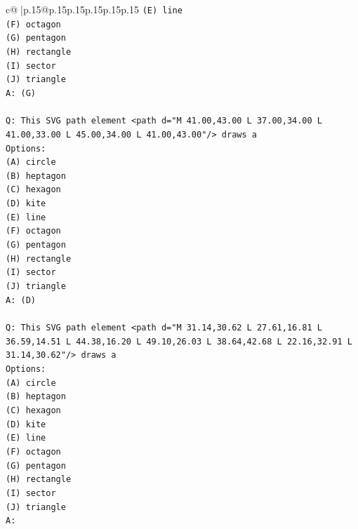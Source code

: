 \documentclass{article}
\begin{document}
{\begin{supertabular}{c@{$\;$}|p{.15\linewidth}@{}p{.15\linewidth}p{.15\linewidth}p{.15\linewidth}p{.15\linewidth}p{.15\linewidth}}
{{{\texttt{(E) line} \\
\texttt{(F) octagon} \\
\texttt{(G) pentagon} \\
\texttt{(H) rectangle} \\
\texttt{(I) sector} \\
\texttt{(J) triangle} \\
\texttt{A: (G)} \\
\\ 
\texttt{Q: This SVG path element <path d="M 41.00,43.00 L 37.00,34.00 L 41.00,33.00 L 45.00,34.00 L 41.00,43.00"/> draws a} \\
\texttt{Options:} \\
\texttt{(A) circle} \\
\texttt{(B) heptagon} \\
\texttt{(C) hexagon} \\
\texttt{(D) kite} \\
\texttt{(E) line} \\
\texttt{(F) octagon} \\
\texttt{(G) pentagon} \\
\texttt{(H) rectangle} \\
\texttt{(I) sector} \\
\texttt{(J) triangle} \\
\texttt{A: (D)} \\
\\ 
\texttt{Q: This SVG path element <path d="M 31.14,30.62 L 27.61,16.81 L 36.59,14.51 L 44.38,16.20 L 49.10,26.03 L 38.64,42.68 L 22.16,32.91 L 31.14,30.62"/> draws a} \\
\texttt{Options:} \\
\texttt{(A) circle} \\
\texttt{(B) heptagon} \\
\texttt{(C) hexagon} \\
\texttt{(D) kite} \\
\texttt{(E) line} \\
\texttt{(F) octagon} \\
\texttt{(G) pentagon} \\
\texttt{(H) rectangle} \\
\texttt{(I) sector} \\
\texttt{(J) triangle} \\
\texttt{A:} \\
            }
        }
    }
     \\ \\


\end{supertabular}}
\end{document}
